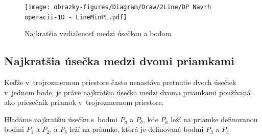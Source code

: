 \begin{figure}[H]
	\centering
	\texttt{[image: obrazky-figures/Diagram/Draw/2Line/DP Navrh operacii-1D -  LineMinPL.pdf]}
	\caption{Najkratšia vzdialenosť medzi úsečkou a bodom}
	\label{fig:LineMinPL}
\end{figure}

\subsection*{Najkratšia úsečka medzi dvomi priamkami}
Keďže v~trojrozmernom priestore často nenastáva pretnutie dvoch úsečiek v~jednom bode, je práve najkratšia úsečka medzi dvoma priamkami používaná ako priesečník priamok v~trojrozmernom priestore.


Hľadáme najkratšiu úsečku s~bodmi $P_a$ a $P_b$, kde $P_a$ leží na priamke definovanou bodmi $P_1$ a $P_2$, a $P_b$ leží na priamke, ktorá je definovaná bodmi $P_3$ a $P_4$.

